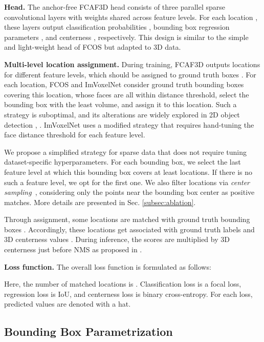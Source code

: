 \documentclass[runningheads]{llncs}
\begin{document}
\textbf{Head.} The anchor-free FCAF3D head consists of three parallel sparse convolutional layers with weights shared across feature levels. For each location , these layers output classification probabilities , bounding box regression parameters , and centerness , respectively. This design is similar to the simple and light-weight head of FCOS \cite{tian2019fcos} but adapted to 3D data.

\textbf{Multi-level location assignment.} During training, FCAF3D outputs locations  for different feature levels, which should be assigned to ground truth boxes . For each location, FCOS \cite{tian2019fcos} and ImVoxelNet \cite{rukhovich2021imvoxelnet} consider ground truth bounding boxes covering this location, whose faces are all within distance threshold, select the bounding box with the least volume, and assign it to this location. Such a strategy is suboptimal, and its alterations are widely explored in 2D object detection \cite{zhang2020atss}, \cite{ge2021ota}. ImVoxelNet \cite{rukhovich2021imvoxelnet} uses a modified strategy that requires hand-tuning the face distance threshold for each feature level.

We propose a simplified strategy for sparse data that does not require tuning dataset-specific hyperparameters. For each bounding box, we select the last feature level at which this bounding box covers at least  locations. If there is no such a feature level, we opt for the first one. We also filter locations via \textit{center sampling}~\cite{tian2019fcos}, considering only the points near the bounding box center as positive matches. More details are presented in Sec. \ref{subsec:ablation}.

Through assignment, some locations  are matched with ground truth bounding boxes . Accordingly, these locations get associated with ground truth labels  and 3D centerness values . During inference, the scores  are multiplied by 3D centerness  just before NMS as proposed in  \cite{rukhovich2021imvoxelnet}.

\textbf{Loss function.} The overall loss function is formulated as follows:

Here, the number of matched locations  is . Classification loss  is a focal loss, regression loss  is IoU, and centerness loss  is binary cross-entropy. For each loss, predicted values are denoted with a hat.

\subsection{Bounding Box Parametrization}
\end{document}
